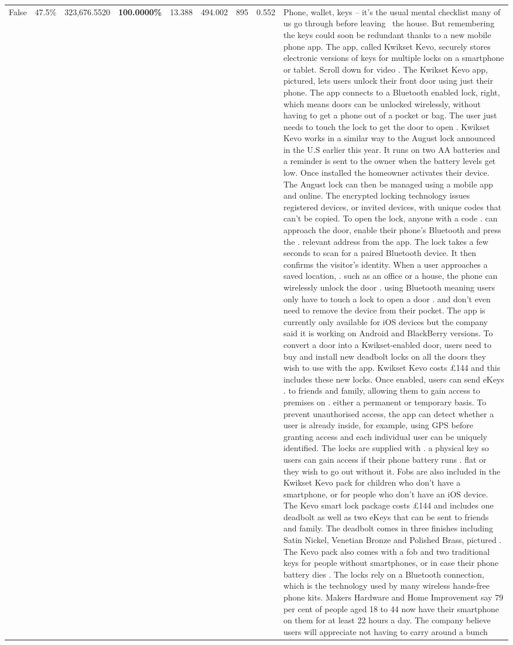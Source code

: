 \begin{table}[H]
\begin{tabular}{lllrlllll}
False & 47.5\% & 323,676.5520 & \bfseries \color{red} 100.0000\% & 13.388 & 494.002 & 895 & 0.552 & Phone, wallet, keys – it’s the usual mental checklist many of us go through before leaving  the house. But remembering the keys could soon be redundant thanks to a new mobile phone app. The app, called Kwikset Kevo, securely stores electronic versions of keys for multiple locks on a smartphone or tablet. Scroll down for video . The Kwikset Kevo app, pictured, lets users unlock their front door using just their phone. The app connects to a Bluetooth enabled lock, right, which means doors can be unlocked wirelessly, without having to get a phone out of a pocket or bag. The user just needs to touch the lock to get the door to open . Kwikset Kevo works in a similar way to the August lock announced in the U.S earlier this year. It runs on two AA batteries and a reminder is sent to the owner when the battery levels get low. Once installed the homeowner activates their device. The August lock can then be managed using a mobile app and online. The encrypted locking technology issues registered devices, or invited devices, with unique codes that can't be copied. To open the lock, anyone with a code . can approach the door, enable their phone's Bluetooth and press the . relevant address from the app. The lock takes a few seconds to scan for a paired Bluetooth device. It then confirms the visitor's identity. When a user approaches a saved location, . such as an office or a house, the phone can wirelessly unlock the door . using Bluetooth meaning users only have to touch a lock to open a door . and don't even need to remove the device from their pocket. The app is currently only available for iOS devices but the company said it is working on Android and BlackBerry versions. To convert a door into a Kwikset-enabled door, users need to buy and install new deadbolt locks on all the doors they wish to use with the app. Kwikset Kevo costs £144 and this includes these new locks. Once enabled, users can send eKeys . to friends and family, allowing them to gain access to premises on . either a permanent or temporary basis. To prevent unauthorised access, the app can detect whether a user is already inside, for example, using GPS before granting access and each individual user can be uniquely identified. The locks are supplied with . a physical key so users can gain access if their phone battery runs . flat or they wish to go out without it. Fobs are also included in the Kwikset Kevo pack for children who don't have a smartphone, or for people who don't have an iOS device. The Kevo smart lock package costs £144 and includes one deadbolt as well as two eKeys that can be sent to friends and family. The deadbolt comes in three finishes including Satin Nickel, Venetian Bronze and Polished Brass, pictured . The Kevo pack also comes with a fob and two traditional keys for people without smartphones, or in case their phone battery dies . The locks rely on a Bluetooth connection, which is the technology used by many wireless hands-free phone kits. Makers Hardware and Home Improvement say 79 per cent of people aged 18 to 44 now have their smartphone on them for at least 22 hours a day. The company believe users will appreciate not having to carry around a bunch 
\end{tabular}
\end{table}
